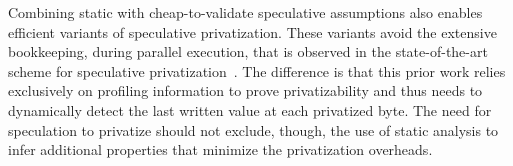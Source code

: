Combining static with cheap-to-validate speculative assumptions also
enables efficient variants of speculative privatization.
%
These variants avoid the extensive bookkeeping, during parallel
execution, that is observed in the state-of-the-art scheme for
speculative privatization~\cite{johnson:12:pldi}.
%
The difference is that this prior work relies exclusively on profiling
information to prove privatizability and thus needs to dynamically
detect the last written value at each privatized byte.
%
The need for speculation to privatize should not exclude, though, the
use of static analysis to infer additional properties that minimize
the privatization overheads.

%
%

%
%


%
%
%

